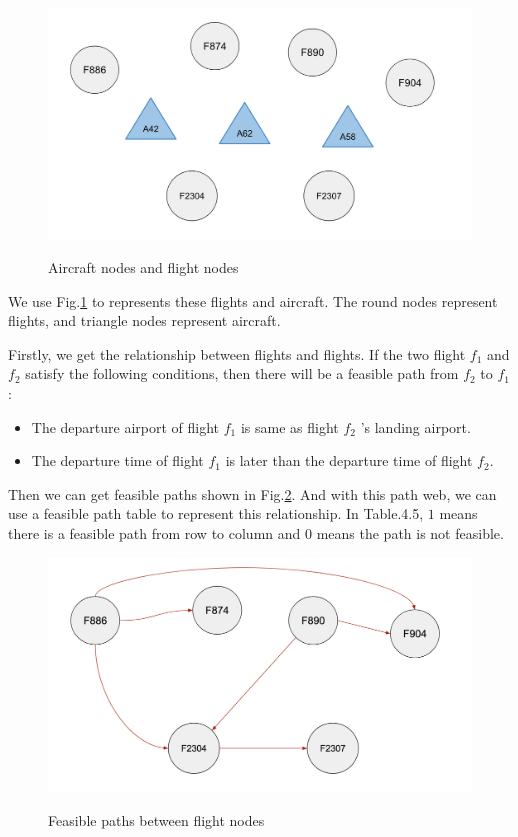 \documentclass[senior]{IPSstyle}
\begin{document}
\begin{figure}[h]
    \centering
    \includegraphics[width=15cm]{MasterThesis-master/nodes.png}\\
    \caption{Aircraft nodes and flight nodes}
    \label{fig:nodes}
\end{figure}
We use Fig.\ref{fig:nodes} to represents these flights and aircraft. The round nodes represent flights, and triangle nodes represent aircraft.

Firstly, we get the relationship between flights and flights. If the two flight \(f_1\) and \(f_2\) satisfy the following conditions, then there will be a feasible path from \(f_2\) to \(f_1\):
\begin{itemize}
    \item The departure airport of flight \(f_1\) is same as flight \(f_2\) 's landing airport.
    \item The departure time of flight \(f_1\) is later than the departure time of flight \(f_2\).
\end{itemize}
Then we can get feasible paths shown in Fig.\ref{fig:f2f}. And with this path web, we can use a feasible path table to represent this relationship. In Table.4.5, \(1\) means there is a feasible path from row to column and \(0\) means the path is not feasible. 
\begin{figure}[h]
    \centering
    \includegraphics[width=15cm]{MasterThesis-master/f2f.png}\\
    \caption{Feasible paths between flight nodes}
    \label{fig:f2f}
\end{figure}
\end{document}
